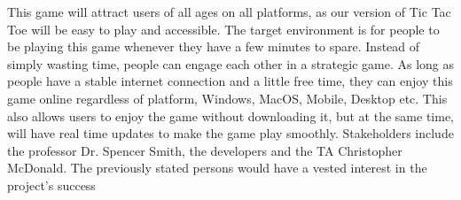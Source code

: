 \documentclass{article}
\begin{document}
This game will attract users of all ages on all platforms, as our version of 
Tic Tac Toe will be easy to play and accessible. The target environment is for 
people to be playing this game whenever they have a few minutes to spare. 
Instead of simply wasting time, people can engage each other in a strategic 
game. As long as people have a stable internet connection and a little free 
time, they can enjoy this game online regardless of platform, Windows, MacOS, 
Mobile, Desktop etc. This also allows users to enjoy the game without 
downloading it, but at the same time, will have real time updates to make the 
game play smoothly. Stakeholders include the professor Dr. Spencer Smith, 
the developers and the TA Christopher McDonald. The previously stated persons
would have a vested interest in the project's success\\
\end{document}
